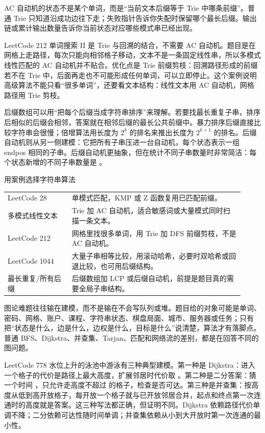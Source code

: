 \begin{mentalmodel}
AC 自动机的状态不是某个单词，而是“当前文本后缀等于 Trie 中哪条前缀”。普通 Trie 只知道沿成功边往下走；失败指针告诉你失配时保留哪个最长后缀。输出链或累计输出数量告诉你当前状态对应哪些模式串已经出现。
\end{mentalmodel}

LeetCode 212 单词搜索 II 是 Trie 与回溯的结合，不需要 AC 自动机。题目是在网格上走路径，每次只能向相邻格子移动，文本不是一条固定线性串，所以多模式线性匹配的 AC 自动机并不贴合。优化点是 Trie 前缀剪枝：回溯路径形成的前缀若不在 Trie 中，后面再走也不可能形成任何单词，可以立即停止。这个案例说明高级算法不能只看“很多单词”，还要看文本结构：线性文本用 AC 自动机，网格路径用 Trie 剪枝。

后缀数组可以用“把每个后缀当成字符串排序”来理解。若要找最长重复子串，排序后相似的后缀会相邻，答案就在相邻后缀的最长公共前缀中。暴力排序后缀直接比较字符串会很慢；倍增算法用长度为 $2^k$ 的排名来推出长度为 $2^{k+1}$ 的排名。后缀自动机则从另一侧建模：它把所有子串压进一台自动机，每个状态表示一组 endpos 相同的子串。后缀自动机更抽象，但在统计不同子串数量时非常简洁：每个状态新增的不同子串数量是 。

\begin{principlebox}{用案例选择字符串算法}
\begin{tabular}{@{}p{0.25\linewidth}p{0.67\linewidth}@{}}
LeetCode 28 & 单模式匹配，KMP 或 Z 函数复用已匹配前缀。\\
多模式线性文本 & Trie 加 AC 自动机，适合敏感词或大量模式同时扫描一条文本。\\
LeetCode 212 & 网格里找很多单词，用 Trie 加 DFS 前缀剪枝，不是 AC 自动机。\\
LeetCode 1044 & 大量子串相等比较，用滚动哈希，必要时双哈希或回退比较，也可用后缀结构。\\
最长重复/所有后缀 & 后缀数组加 LCP 或后缀自动机，前提是题目真的需要全局子串结构。\\
\end{tabular}
\end{principlebox}


图论难题往往输在建模，而不是输在不会写队列或堆。题目给的对象可能是单词、密码、网格、账户、课程、字符串状态、棋盘局面、城市、服务器或任务；只有把“状态是什么，边是什么，边权是什么，目标是什么”说清楚，算法才有落脚点。普通 BFS、Dijkstra、并查集、Tarjan、匹配和网络流的差别，都是在回答不同的图问题。

LeetCode 778 水位上升的泳池中游泳有三种典型建模。第一种是 Dijkstra：进入一个格子的代价是路径上最大高度，扩展邻居时代价取 。第二种是二分答案：猜一个时间 ，只允许走高度不超过  的格子，检查是否可达。第三种是并查集：按高度从低到高开放格子，每开放一个格子就与已开放邻居合并，起点和终点第一次连通时的高度就是答案。这三种写法都正确，但证明不同。Dijkstra 依赖路径代价单调不降；二分依赖可达性随时间单调；并查集依赖从小到大开放时第一次连通的最小性。

